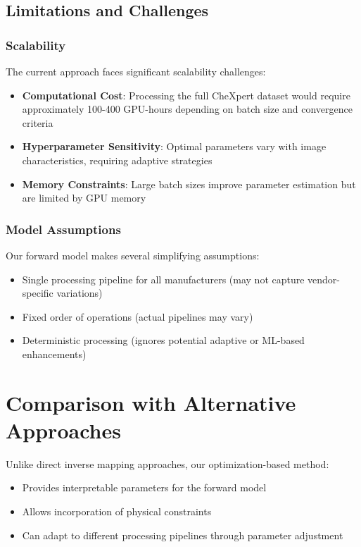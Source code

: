 \documentclass[nomenclature, english, bibtex]{kththesis}
\numberwithin{listing}{chapter}
\begin{document}
\subsection{Limitations and Challenges}
\subsubsection{Scalability}
The current approach faces significant scalability challenges:
\begin{itemize}
    \item \textbf{Computational Cost}: Processing the full CheXpert dataset would require approximately 100-400 GPU-hours depending on batch size and convergence criteria
    \item \textbf{Hyperparameter Sensitivity}: Optimal parameters vary with image characteristics, requiring adaptive strategies
    \item \textbf{Memory Constraints}: Large batch sizes improve parameter estimation but are limited by GPU memory
\end{itemize}

\subsubsection{Model Assumptions}
Our forward model makes several simplifying assumptions:
\begin{itemize}
    \item Single processing pipeline for all manufacturers (may not capture vendor-specific variations)
    \item Fixed order of operations (actual pipelines may vary)
    \item Deterministic processing (ignores potential adaptive or ML-based enhancements)
\end{itemize}

\section{Comparison with Alternative Approaches}
Unlike direct inverse mapping approaches, our optimization-based method:
\begin{itemize}
    \item Provides interpretable parameters for the forward model
    \item Allows incorporation of physical constraints
    \item Can adapt to different processing pipelines through parameter adjustment
\end{itemize}
\end{document}
